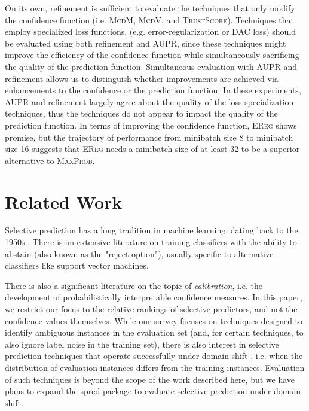 \documentclass[11pt]{article}
\begin{document}
On its own, refinement is sufficient to evaluate the techniques that only modify the confidence function (i.e. \textsc{McdM}, \textsc{McdV}, and \textsc{TrustScore}). Techniques that employ specialized loss functions, (e.g. error-regularization or DAC loss) should be evaluated using both refinement and AUPR, since these techniques might improve the efficiency of the confidence function while simultaneously sacrificing the quality of the prediction function. Simultaneous evaluation with AUPR and refinement allows us to distinguish whether improvements are achieved via enhancements to the confidence or the prediction function. In these experiments, AUPR and refinement largely agree about the quality of the loss specialization techniques, thus the techniques do not appear to impact the quality of the prediction function. In terms of improving the confidence function, \textsc{EReg} shows promise, but the trajectory of performance from minibatch size 8 to minibatch size 16 suggests that \textsc{EReg} needs a minibatch size of at least 32 to be a superior alternative to \textsc{MaxProb}.

\section{Related Work}

Selective prediction has a long tradition in machine learning, dating back to the  1950s \cite{chow1957optimum}. There is an extensive literature \cite{hellman1970nearest,fumera2002support,cortes2016learning} on training classifiers with the ability to abstain (also known as the "reject option"), usually specific to alternative classifiers like support vector machines.

There is also a significant literature \cite{platt1999probabilistic,guo2017calibration,kumar2018trainable,wang-etal-2020-inference,desai-durrett-2020-calibration} on the topic of \emph{calibration}, i.e. the development of probabilistically interpretable confidence measures. In this paper, we restrict our focus to the relative rankings of selective predictors, and not the confidence values themselves. 
While our survey focuses on techniques designed to identify ambiguous instances in the evaluation set (and, for certain techniques, to also ignore label noise in the training set), there is also interest in selective prediction techniques that operate successfully under domain shift \cite{kamath-etal-2020-selective,liu2020energy}, i.e. when the distribution of evaluation instances differs from the training instances. Evaluation of such techniques is beyond the scope of the work described here, but we have plans to expand the \textsf{spred} package to evaluate selective prediction under domain shift.
\end{document}
